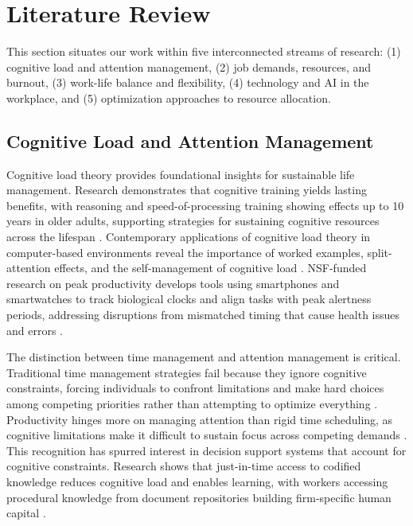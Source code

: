 \section{Literature Review}\label{sec:literature}

This section situates our work within five interconnected streams of research: (1) cognitive load and attention management, (2) job demands, resources, and burnout, (3) work-life balance and flexibility, (4) technology and AI in the workplace, and (5) optimization approaches to resource allocation.

\subsection{Cognitive Load and Attention Management}

Cognitive load theory provides foundational insights for sustainable life management. Research demonstrates that cognitive training yields lasting benefits, with reasoning and speed-of-processing training showing effects up to 10 years in older adults, supporting strategies for sustaining cognitive resources across the lifespan \citep{NIA2014}. Contemporary applications of cognitive load theory in computer-based environments reveal the importance of worked examples, split-attention effects, and the self-management of cognitive load \citep{ayres_something_2020}. NSF-funded research on peak productivity develops tools using smartphones and smartwatches to track biological clocks and align tasks with peak alertness periods, addressing disruptions from mismatched timing that cause health issues and errors \citep{Lefkowitz2018}.

The distinction between time management and attention management is critical. Traditional time management strategies fail because they ignore cognitive constraints, forcing individuals to confront limitations and make hard choices among competing priorities rather than attempting to optimize everything \citep{Hart2024}. Productivity hinges more on managing attention than rigid time scheduling, as cognitive limitations make it difficult to sustain focus across competing demands \citep{Grant2019}. This recognition has spurred interest in decision support systems that account for cognitive constraints. Research shows that just-in-time access to codified knowledge reduces cognitive load and enables learning, with workers accessing procedural knowledge from document repositories building firm-specific human capital \citep{subramani_capability_2021}.

